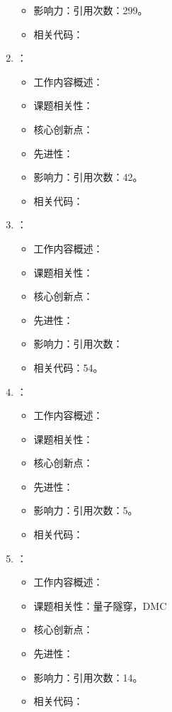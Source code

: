 \begin{enumerate}
\begin{itemize}
                \item 影响力：引用次数：299。
                \item 相关代码：
            \end{itemize}
            \item \citet{nemec2010diffusion}：
            \begin{itemize}
                \item 工作内容概述：
                \item 课题相关性：
                \item 核心创新点：
                \item 先进性：
                \item 影响力：引用次数：42。
                \item 相关代码：
            \end{itemize}
            \item \citet{boninsegni2012population}：
            \begin{itemize}
                \item 工作内容概述：
                \item 课题相关性：
                \item 核心创新点：
                \item 先进性：
                \item 影响力：引用次数：
                \item 相关代码：54。
            \end{itemize}
            \item \citet{pollet2018stochastic}：
            \begin{itemize}
                \item 工作内容概述：
                \item 课题相关性：
                \item 核心创新点：
                \item 先进性：
                \item 影响力：引用次数：5。
                \item 相关代码：
            \end{itemize}
            \item \citet{inack2018understanding}：
            \begin{itemize}
                \item 工作内容概述：
                \item 课题相关性：量子隧穿，DMC
                \item 核心创新点：
                \item 先进性：
                \item 影响力：引用次数：14。
                \item 相关代码：
            \end{itemize}
    \end{enumerate}
    
